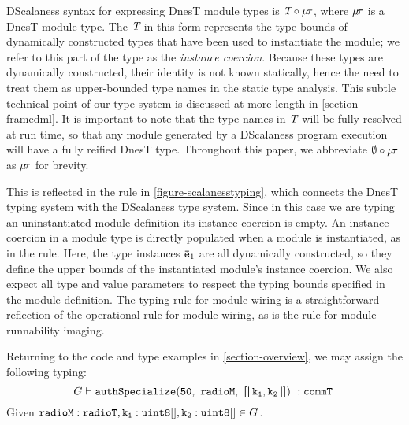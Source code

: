 DScalaness syntax for expressing DnesT module types is $\jmodt{\tpdecl}{\jmodtcat}$, where
$\jmodtcat$ is a DnesT module type. The $\tpdecl$ in this form represents the type bounds of
dynamically constructed types that have been used to instantiate the module; we refer to this
part of the type as the \emph{instance coercion}. Because these types are dynamically
constructed, their identity is not known statically, hence the need to treat them as
upper-bounded type names in the static type analysis. This subtle technical point of our type
system is discussed at more length in \autoref{section-framedml}. It is important to note that
the type names in $\tpdecl$ will be fully resolved at run time, so that any module generated by
a DScalaness program execution will have a fully reified DnesT type. Throughout this paper, we
abbreviate $\jmodt{\emptyset}{\jmodtcat}$ as $\jmodtcat$ for brevity.

This is reflected in the  rule in \autoref{figure-scalanesstyping}, which connects
the DnesT typing system with the DScalaness type system. Since in this case we are typing an
uninstantiated module definition its instance coercion is empty. An instance coercion in a
module type is directly populated when a module is instantiated, as in the 
rule. Here, the type instances $\ttvec{e}_1$ are all dynamically constructed, so they define the
upper bounds of the instantiated module's instance coercion. We also expect all type and value
parameters to respect the typing bounds specified in the module definition.
The  typing rule for module wiring is a straightforward reflection of the
operational rule for module wiring, as is the  rule for module runnability
imaging.
\begin{exmp}
\label{example-scalanesstyping}
Returning to the code and type examples in \autoref{section-overview}, we may assign the
following typing:
$$
  G \vdash \tt{authSpecialize}(\tt{50},\ \tt{radioM},\ \arr{\tt{k_1,k_2}}) \ : \tt{commT}\  
$$
Given $\tt{radioM : radioT, k_1 : uint8[], k_2 : uint8[]} \in G$.  
\end{exmp}

\scalanesstypingfig
